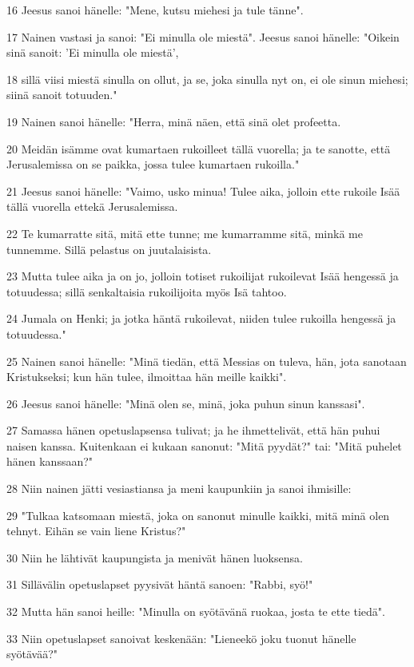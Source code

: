 \par 16 Jeesus sanoi hänelle: "Mene, kutsu miehesi ja tule tänne".
\par 17 Nainen vastasi ja sanoi: "Ei minulla ole miestä". Jeesus sanoi hänelle: "Oikein sinä sanoit: 'Ei minulla ole miestä',
\par 18 sillä viisi miestä sinulla on ollut, ja se, joka sinulla nyt on, ei ole sinun miehesi; siinä sanoit totuuden."
\par 19 Nainen sanoi hänelle: "Herra, minä näen, että sinä olet profeetta.
\par 20 Meidän isämme ovat kumartaen rukoilleet tällä vuorella; ja te sanotte, että Jerusalemissa on se paikka, jossa tulee kumartaen rukoilla."
\par 21 Jeesus sanoi hänelle: "Vaimo, usko minua! Tulee aika, jolloin ette rukoile Isää tällä vuorella ettekä Jerusalemissa.
\par 22 Te kumarratte sitä, mitä ette tunne; me kumarramme sitä, minkä me tunnemme. Sillä pelastus on juutalaisista.
\par 23 Mutta tulee aika ja on jo, jolloin totiset rukoilijat rukoilevat Isää hengessä ja totuudessa; sillä senkaltaisia rukoilijoita myös Isä tahtoo.
\par 24 Jumala on Henki; ja jotka häntä rukoilevat, niiden tulee rukoilla hengessä ja totuudessa."
\par 25 Nainen sanoi hänelle: "Minä tiedän, että Messias on tuleva, hän, jota sanotaan Kristukseksi; kun hän tulee, ilmoittaa hän meille kaikki".
\par 26 Jeesus sanoi hänelle: "Minä olen se, minä, joka puhun sinun kanssasi".
\par 27 Samassa hänen opetuslapsensa tulivat; ja he ihmettelivät, että hän puhui naisen kanssa. Kuitenkaan ei kukaan sanonut: "Mitä pyydät?" tai: "Mitä puhelet hänen kanssaan?"
\par 28 Niin nainen jätti vesiastiansa ja meni kaupunkiin ja sanoi ihmisille:
\par 29 "Tulkaa katsomaan miestä, joka on sanonut minulle kaikki, mitä minä olen tehnyt. Eihän se vain liene Kristus?"
\par 30 Niin he lähtivät kaupungista ja menivät hänen luoksensa.
\par 31 Sillävälin opetuslapset pyysivät häntä sanoen: "Rabbi, syö!"
\par 32 Mutta hän sanoi heille: "Minulla on syötävänä ruokaa, josta te ette tiedä".
\par 33 Niin opetuslapset sanoivat keskenään: "Lieneekö joku tuonut hänelle syötävää?"
